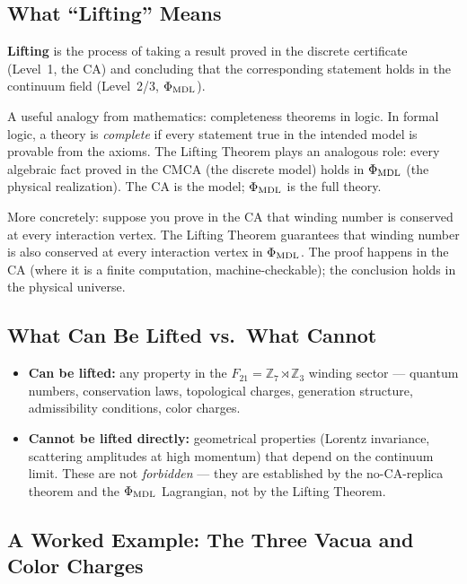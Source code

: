 \documentclass[11pt,a4paper]{article}
\newcommand{\term}[1]{\textbf{#1}}
\newcommand{\PhiMDL}{\Phi_{\rm MDL}}
\newcommand{\ZS}{\mathbb{Z}_7}
\begin{document}
\subsection{What ``Lifting'' Means}

\term{Lifting} is the process of taking a result proved in the discrete
certificate (Level~1, the CA) and concluding that the corresponding statement
holds in the continuum field (Level~2/3, $\PhiMDL$).

\medskip
A useful analogy from mathematics: completeness theorems in logic.
In formal logic, a theory is \emph{complete} if every statement true in
the intended model is provable from the axioms.
The Lifting Theorem plays an analogous role: every algebraic fact proved in
the CMCA (the discrete model) holds in $\PhiMDL$ (the physical realization).
The CA is the model; $\PhiMDL$ is the full theory.

\medskip
More concretely: suppose you prove in the CA that winding number is conserved
at every interaction vertex.
The Lifting Theorem guarantees that winding number is also conserved at every
interaction vertex in $\PhiMDL$.
The proof happens in the CA (where it is a finite computation, machine-checkable);
the conclusion holds in the physical universe.

\subsection{What Can Be Lifted vs.\ What Cannot}

\begin{itemize}[itemsep=5pt]
  \item \textbf{Can be lifted:} any property in the $F_{21} = \ZS\rtimes\mathbb{Z}_3$
    winding sector --- quantum numbers, conservation laws, topological charges,
    generation structure, admissibility conditions, color charges.
  \item \textbf{Cannot be lifted directly:} geometrical properties
    (Lorentz invariance, scattering amplitudes at high momentum) that
    depend on the continuum limit.
    These are not \emph{forbidden} --- they are established by the no-CA-replica
    theorem and the $\PhiMDL$ Lagrangian, not by the Lifting Theorem.
\end{itemize}

\subsection{A Worked Example: The Three Vacua and Color Charges}
\end{document}
